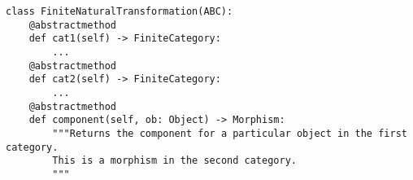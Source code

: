 \par\begin{minipage}{79ex}
\begin{verbatim}
class FiniteNaturalTransformation(ABC):
    @abstractmethod
    def cat1(self) -> FiniteCategory:
        ...
    @abstractmethod
    def cat2(self) -> FiniteCategory:
        ...
    @abstractmethod
    def component(self, ob: Object) -> Morphism:
        """Returns the component for a particular object in the first category.
        This is a morphism in the second category.
        """
\end{verbatim}
\end{minipage}\par